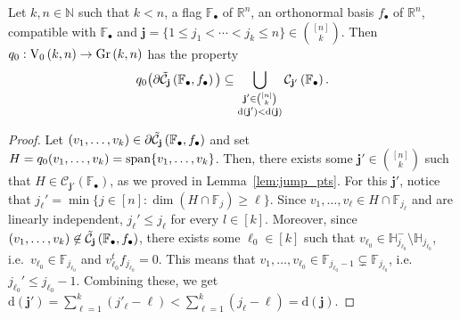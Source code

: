 \begin{lemma}\label{lem:q0_on_bdr} Let $k,n\in\mathbb{N}$ such that $k<n$, a flag $\mathbb{F}_{\bullet}$ of $\mathbb{R}^n$, an orthonormal basis $f_{\bullet}$ of $\mathbb{R}^n$, compatible with $\mathbb{F}_{\bullet}$ and $\mathbf{j}=\{1\leq j_1<\cdots<j_k\leq n\}\in\binom{[n]}{k}$. Then $q_0:\StO{k}{n}\to\Gr{k}{n}$ has the property
\[q_0\big(\partial\tilde{\mathcal{C}}_{\mathbf{j}}\left(\mathbb{F}_{\bullet},f_{\bullet}\right)\big)\subseteq\bigcup_{\substack{\mathbf{j}'\in\binom{[n]}{k}\\\mathrm{d}(\mathbf{j}')<\mathrm{d}(\mathbf{j})}}\mathcal{C}_{\mathbf{j'}}\left(\mathbb{F}_{\bullet}\right).\]
\end{lemma}
\begin{proof} Let $(v_1,\ldots,v_k)\in\partial\tilde{\mathcal{C}}_{\mathbf{j}}\left(\mathbb{F}_{\bullet},f_{\bullet}\right)$ and set $H=q_0(v_1,\ldots,v_k)=\mathrm{span}\{v_1,\ldots,v_k\}$. Then, there exists some $\mathbf{j}'\in\binom{[n]}{k}$ such that $H\in\mathcal{C}_{\mathbf{j}'}(\mathbb{F}_{\bullet})$, as we proved in Lemma~\ref{lem:jump_pts}. For this $\mathbf{j}'$, notice that $j_{\ell}'=\min\{j\in[n]:\dim(H\cap\mathbb{F}_j)\geq\ell\}$. Since $v_1,\ldots,v_{\ell}\in H\cap\mathbb{F}_{j_{\ell}}$ and are linearly independent, $j_{\ell}'\leq j_{\ell}$ for every $l\in[k]$. Moreover, since $(v_1,\ldots,v_k)\not\in\tilde{\mathcal{C}}_{\mathbf{j}}\left(\mathbb{F}_{\bullet},f_{\bullet}\right)$, there exists some $\ell_0\in[k]$ such that $v_{\ell_0}\in\mathbb{H}_{j_{\ell_0}}^-\setminus\mathbb{H}_{j_{\ell_0}}$, i.e.\ $v_{\ell_0}\in\mathbb{F}_{j_{\ell_0}}$ and $v_{\ell_0}^tf_{j_{\ell_0}}=0$. This means that $v_1,\ldots,v_{\ell_0}\in\mathbb{F}_{j_{\ell_0}-1}\subsetneq\mathbb{F}_{j_{\ell_0}}$, i.e.\ $j_{\ell_0}'\leq j_{\ell_0}-1$. Combining these, we get $\mathrm{d}(\mathbf{j}')=\sum_{\ell=1}^k(j'_{\ell}-\ell)<\sum_{\ell=1}^k(j_{\ell}-\ell)=\mathrm{d}(\mathbf{j})$.
\end{proof}

